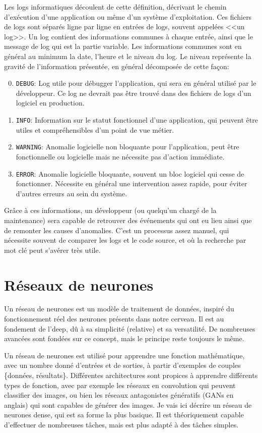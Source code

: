 \documentclass[openany, 11pt]{memoir}
\begin{document}
Les logs informatiques découlent de cette définition, décrivant le chemin d'exécution d'une application ou même d'un système d'exploitation. Ces fichiers de logs sont séparés ligne par ligne en entrées de logs, souvent appelées <<un log>>. Un log contient des informations communes à chaque entrée, ainsi que le message de log qui est la partie variable. Les informations communes sont en général au minimum la date, l'heure et le niveau du log. Le niveau représente la gravité de l'information présentée, en général décomposée de cette façon:

\begin{enumerate}
	\setcounter{enumi}{-1}
	\item \texttt{DEBUG}: Log utile pour débugger l'application, qui sera en général utilisé par le développeur. Ce log ne devrait pas être trouvé dans des fichiers de logs d'un logiciel en production.
	\item \texttt{INFO}: Information sur le statut fonctionnel d'une application, qui peuvent être utiles et compréhensibles d'un point de vue métier.
	\item \texttt{WARNING}: Anomalie logicielle non bloquante pour l'application, peut être fonctionnelle ou logicielle mais ne nécessite pas d'action immédiate.
	\item \texttt{ERROR}: Anomalie logicielle bloquante, souvent un bloc logiciel qui cesse de fonctionner. Nécessite en général une intervention assez rapide, pour éviter d'autres erreurs au sein du système.
\end{enumerate}

Grâce à ces informations, un développeur (ou quelqu'un chargé de la maintenance) sera capable de retrouver des événements qui ont eu lieu ainsi que de remonter les causes d'anomalies. C'est un processus assez manuel, qui nécessite souvent de comparer les logs et le code source, et où la recherche par mot clé peut s'avérer très utile.

\section{Réseaux de neurones}

Un réseau de neurones est un modèle de traitement de données, inspiré du fonctionnement réel des neurones présents dans notre cerveau. Il est au fondement de l'\gls{deep}, dû à sa simplicité (relative) et sa versatilité. De nombreuses avancées sont fondées sur ce concept, mais le principe reste toujours le même.

Un réseau de neurones est utilisé pour apprendre une fonction mathématique, avec un nombre donné d'entrées et de sorties, à partir d'exemples de couples \{données, résultats\}. Différentes architectures sont propices à apprendre différents types de fonction, avec par exemple les réseaux en convolution qui peuvent classifier des images, ou bien les réseaux antagonistes génératifs (GANs en anglais) qui sont capables de générer des images. Je vais ici décrire un réseau de neurones dense, qui est sa forme la plus basique. Il est théoriquement capable d'effectuer de nombreuses tâches, mais est plus adapté à des tâches simples.
\end{document}
